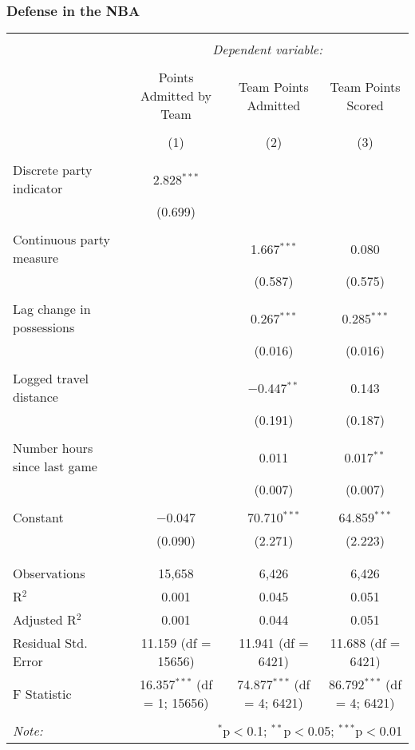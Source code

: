 \documentclass{beamer}
\begin{document}
\begin{frame}   \frametitle{Defense in the NBA}
  \begin{adjustwidth}{-.75cm}{}
  \tiny{
  \begin{tabular}{@{\extracolsep{5pt}}lccc}  \\[-1.8ex]\hline  \hline \\[-1.8ex]   & \multicolumn{3}{c}{\textit{Dependent variable:}} \\  \cline{2-4}  \\[-1.8ex] & Points Admitted by Team & Team Points Admitted & Team Points Scored \\  \\[-1.8ex] & (1) & (2) & (3)\\  \hline \\[-1.8ex]   Discrete party indicator & 2.828$^{***}$ &  &  \\    & (0.699) &  &  \\    & & & \\   Continuous party measure &  & 1.667$^{***}$ & 0.080 \\    &  & (0.587) & (0.575) \\    & & & \\   Lag change in possessions &  & 0.267$^{***}$ & 0.285$^{***}$ \\    &  & (0.016) & (0.016) \\    & & & \\   Logged travel distance &  & $-$0.447$^{**}$ & 0.143 \\    &  & (0.191) & (0.187) \\    & & & \\   Number hours since last game &  & 0.011 & 0.017$^{**}$ \\    &  & (0.007) & (0.007) \\    & & & \\   Constant & $-$0.047 & 70.710$^{***}$ & 64.859$^{***}$ \\    & (0.090) & (2.271) & (2.223) \\    & & & \\  \hline \\[-1.8ex]  Observations & 15,658 & 6,426 & 6,426 \\  R$^{2}$ & 0.001 & 0.045 & 0.051 \\  Adjusted R$^{2}$ & 0.001 & 0.044 & 0.051 \\  Residual Std. Error & 11.159 (df = 15656) & 11.941 (df = 6421) & 11.688 (df = 6421) \\  F Statistic & 16.357$^{***}$ (df = 1; 15656) & 74.877$^{***}$ (df = 4; 6421) & 86.792$^{***}$ (df = 4; 6421) \\  \hline  \hline \\[-1.8ex]  \textit{Note:}  & \multicolumn{3}{r}{$^{*}$p$<$0.1; $^{**}$p$<$0.05; $^{***}$p$<$0.01} \\  \end{tabular}  
}
\end{adjustwidth} \end{frame}
\end{document}
